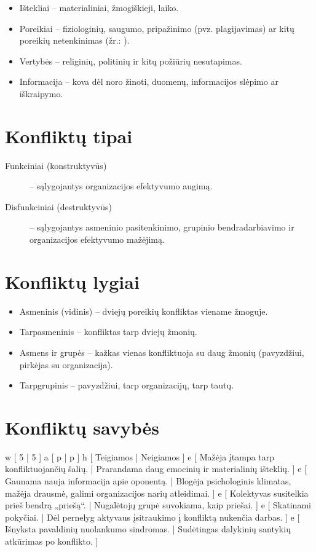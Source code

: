 \begin{itemize}
  \item Ištekliai – materialiniai, žmogiškieji, laiko.
  \item Poreikiai – fiziologinių, saugumo, pripažinimo (pvz. plagijavimas)
    ar kitų poreikių netenkinimas (žr.: ).
  \item Vertybės – religinių, politinių ir kitų požiūrių nesutapimas.
  \item Informacija – kova dėl noro žinoti, duomenų, informacijos
    slėpimo ar iškraipymo.
\end{itemize}

\section{Konfliktų tipai}

\begin{description}
  \item[Funkciniai (konstruktyvūs)] – sąlygojantys organizacijos efektyvumo
    augimą.
  \item[Disfunkciniai (destruktyvūs)] – sąlygojantys asmeninio
    pasitenkinimo, grupinio bendradarbiavimo ir organizacijos efektyvumo
    mažėjimą.
\end{description}

\section{Konfliktų lygiai}

\begin{itemize}
  \item Asmeninis (vidinis) – dviejų poreikių konfliktas viename žmoguje.
  \item Tarpasmeninis – konfliktas tarp dviejų žmonių.
  \item Asmens ir grupės – kažkas vienas konfliktuoja su daug žmonių
    (pavyzdžiui, pirkėjas su organizacija).
  \item Tarpgrupinis – pavyzdžiui, tarp organizacijų, tarp tautų.
\end{itemize}

\section{Konfliktų savybės}

\xtable
{
  w [ 5 | 5 ]
  a [ p | p ]
  h [ Teigiamos | Neigiamos ]
  e [ Mažėja įtampa tarp konfliktuojančių šalių.
    | Prarandama daug emocinių ir materialinių išteklių. ]
  e [ Gaunama nauja informacija apie oponentą.
    | Blogėja psichologinis klimatas, mažėja drausmė, galimi
      organizacijos narių atleidimai. ]
  e [ Kolektyvas susitelkia prieš bendrą „priešą“.
    | Nugalėtojų grupė suvokiama, kaip priešai. ]
  e [ Skatinami pokyčiai.
    | Dėl pernelyg aktyvaus įsitraukimo į konfliktą nukenčia darbas. ]
  e [ Išnyksta pavaldinių nuolankumo sindromas.
    | Sudėtingas dalykinių santykių atkūrimas po konflikto. ]
}

